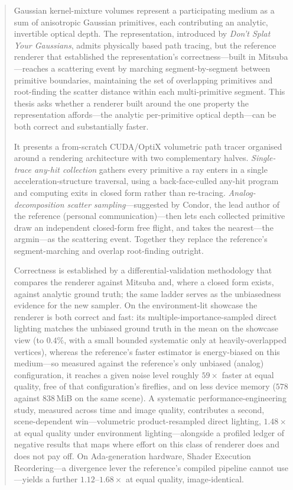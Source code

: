 \begin{abstract}

Gaussian kernel-mixture volumes represent a participating medium as a sum of anisotropic Gaussian
primitives, each contributing an analytic, invertible optical depth. The representation, introduced by
\emph{Don't Splat Your Gaussians}, admits physically based path tracing, but the reference renderer
that established the representation's correctness---built in Mitsuba---reaches a scattering event by marching
segment-by-segment between primitive boundaries, maintaining the set of overlapping primitives and
root-finding the scatter distance within each multi-primitive segment. This thesis asks whether a renderer built around the one
property the representation affords---the analytic per-primitive optical depth---can be both correct
and substantially faster.

It presents a from-scratch CUDA/OptiX volumetric path tracer organised around a rendering
architecture with two complementary halves. \emph{Single-trace any-hit collection} gathers every
primitive a ray enters in a single acceleration-structure traversal, using a back-face-culled
any-hit program and computing exits in closed form rather than re-tracing. \emph{Analog-decomposition
scatter sampling}---suggested by Condor, the lead author of the reference (personal communication)---then lets
each collected primitive draw an independent closed-form free flight, and takes the nearest---the
argmin---as the scattering event. Together they replace the reference's segment-marching and
overlap root-finding outright.

Correctness is established by a differential-validation methodology that compares the renderer against
Mitsuba and, where a closed form exists, against analytic ground truth; the same ladder serves as the
unbiasedness evidence for the new sampler. On the environment-lit showcase the renderer is both correct and fast: its
multiple-importance-sampled direct lighting matches the unbiased ground truth in the mean on the showcase view (to $0.4\%$,
with a small bounded systematic only at heavily-overlapped vertices), whereas the reference's faster estimator is energy-biased on this medium---so measured against the
reference's only unbiased (analog) configuration, it reaches a given noise level roughly $59\times$
faster at equal quality, free of that configuration's fireflies, and on less device memory ($578$
against $838$\,MiB on the same scene). A systematic performance-engineering study, measured across time
and image quality, contributes a second, scene-dependent win---volumetric product-resampled direct
lighting, $1.48\times$ at equal quality under environment lighting---alongside a profiled ledger of
negative results that maps where effort on this class of renderer does and does not pay off. On
Ada-generation hardware, Shader Execution Reordering---a divergence lever the reference's compiled
pipeline cannot use---yields a further $1.12$--$1.68\times$ at equal quality, image-identical.

\end{abstract}
